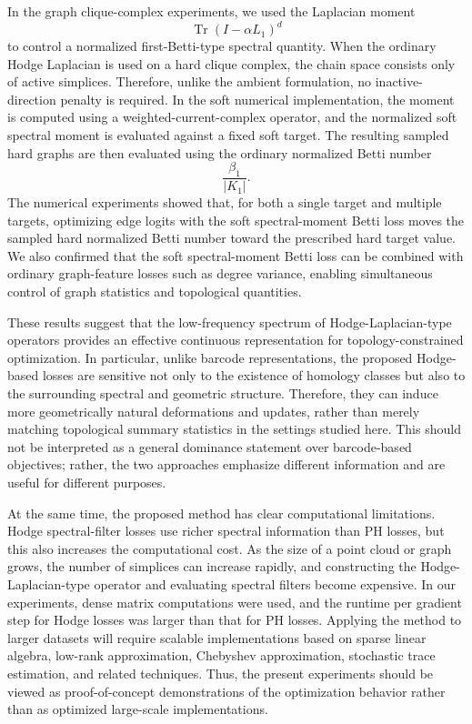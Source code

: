 \documentclass[pdflatex,sn-mathphys-ay]{sn-jnl}%
\theoremstyle{thmstyleone}%
\theoremstyle{thmstyletwo}%
\theoremstyle{thmstylethree}%
\begin{document}
In the graph clique-complex experiments, we used the Laplacian moment
\[
\operatorname{Tr}
\left(
I-\alpha L_1
\right)^d
\]
to control a normalized first-Betti-type spectral quantity. When the ordinary Hodge Laplacian is used on a hard clique complex, the chain space consists only of active simplices. Therefore, unlike the ambient formulation, no inactive-direction penalty is required. In the soft numerical implementation, the moment is computed using a weighted-current-complex operator, and the normalized soft spectral moment is evaluated against a fixed soft target. The resulting sampled hard graphs are then evaluated using the ordinary normalized Betti number
\[
\frac{\beta_1}{|K_1|}.
\]
The numerical experiments showed that, for both a single target and multiple targets, optimizing edge logits with the soft spectral-moment Betti loss moves the sampled hard normalized Betti number toward the prescribed hard target value. We also confirmed that the soft spectral-moment Betti loss can be combined with ordinary graph-feature losses such as degree variance, enabling simultaneous control of graph statistics and topological quantities.

These results suggest that the low-frequency spectrum of Hodge-Laplacian-type operators provides an effective continuous representation for topology-constrained optimization. In particular, unlike barcode representations, the proposed Hodge-based losses are sensitive not only to the existence of homology classes but also to the surrounding spectral and geometric structure. Therefore, they can induce more geometrically natural deformations and updates, rather than merely matching topological summary statistics in the settings studied here.
This should not be interpreted as a general dominance statement over barcode-based objectives; rather, the two approaches emphasize different information and are useful for different purposes.

At the same time, the proposed method has clear computational limitations. Hodge spectral-filter losses use richer spectral information than PH losses, but this also increases the computational cost. As the size of a point cloud or graph grows, the number of simplices can increase rapidly, and constructing the Hodge-Laplacian-type operator and evaluating spectral filters become expensive. In our experiments, dense matrix computations were used, and the runtime per gradient step for Hodge losses was larger than that for PH losses. Applying the method to larger datasets will require scalable implementations based on sparse linear algebra, low-rank approximation, Chebyshev approximation, stochastic trace estimation, and related techniques.
Thus, the present experiments should be viewed as proof-of-concept demonstrations of the optimization behavior rather than as optimized large-scale implementations.
\end{document}

